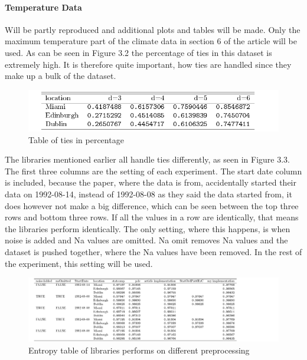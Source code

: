 \FloatBarrier

\paragraph{Temperature Data}
\cite{Chagas2022} Will be partly reproduced and additional plots and tables will be made. Only the maximum temperature part of the climate data in section 6 of the article will be used. As can be seen in Figure 3.2 the percentage of ties in this dataset is extremely high. It is therefore quite important, how ties are handled since they make up a bulk of the dataset. 
\begin{figure}
    \centering
    \includegraphics{Weather/tiesTable.pdf}
    \caption{Table of ties in percentage}
\end{figure}


The libraries mentioned earlier all handle ties differently, as seen in Figure 3.3. The first three columns are the setting of each experiment. The start date column is included, because the paper, where the data is from, accidentally started their data on 1992-08-14, instead of 1992-08-08 as they said the data started from, it does however not make a big difference, which can be seen between the top three rows and bottom three rows.  If all the values in a row are identically, that means the libraries perform identically. The only setting, where this happens, is when noise is added and Na values are omitted. Na omit removes Na values and the dataset is pushed together, where the Na values have been removed. In the rest of the experiment, this setting will be used. 

\begin{figure}
    \centering
    \includegraphics[width=\textwidth,keepaspectratio]{Weather/entropyTable.pdf}
    \caption{Entropy table of libraries performs on different preprocessing}
\end{figure}

